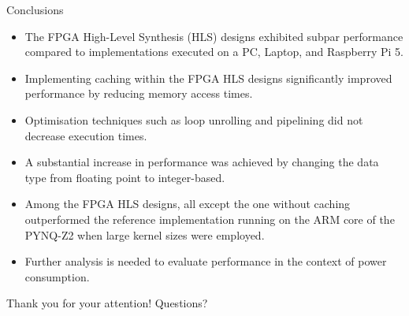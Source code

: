 \documentclass[british, svgnames, dvipsnames]{upb-beamer}
\begin{document}
\begin{frame}{Conclusions}
    \begin{itemize}
        \setlength\itemsep{0.5cm}
        \pause
        \item The FPGA High-Level Synthesis (HLS) designs exhibited subpar performance compared to implementations executed on a PC, Laptop, and Raspberry Pi 5.
        \pause
        \item Implementing caching within the FPGA HLS designs significantly improved performance by reducing memory access times.
        \pause
        \item Optimisation techniques such as loop unrolling and pipelining did not decrease execution times.
        \pause
        \item A substantial increase in performance was achieved by changing the data type from floating point to integer-based.
        \pause
        \item Among the FPGA HLS designs, all except the one without caching outperformed the reference implementation running on the ARM core of the PYNQ-Z2 when large kernel sizes were employed.
        \pause
        \item Further analysis is needed to evaluate performance in the context of power consumption.
    \end{itemize}
\end{frame}

\begin{frame}
    \hfill\Huge{Thank you for your attention! Questions?}
    \color{structure.fg!75!black}{\rule{\textwidth}{0.05cm}}
\end{frame}
\end{document}
